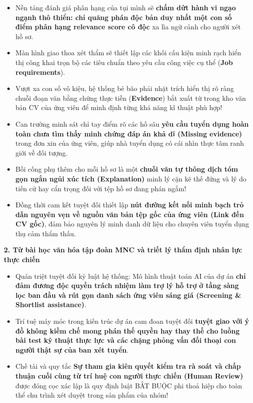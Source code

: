 \begin{itemize}
\tightlist
\item
  Nền tảng đánh giá phân hạng của tụi mình sẽ \textbf{chấm dứt hành vi
  ngạo ngạnh thô thiển: chỉ quăng phán độc bản duy nhất một con số điểm
  phân hạng relevance score cô độc} xa lìa ngữ cảnh cho người xét hồ sơ.
\item
  Màn hình giao thoa xét thẩm sẽ thiết lập các khối cấu kiện minh rạch
  hiển thị công khai trọn bộ các tiêu chuẩn theo yêu cầu công việc cụ
  thể (\textbf{Job requirements}).
\item
  Vượt xa con số vô kiệu, hệ thống bẻ bão phải nhặt trích hiển thị rõ
  ràng chuỗi đoạn văn bằng chứng thực tiễn (\textbf{Evidence}) bắt xuất
  từ trong kho văn bản CV của ứng viên để minh định từng khả năng kĩ
  thuật phù hợp!
\item
  Can trường minh sát chỉ tay điểm rõ các hố sâu \textbf{yêu cầu tuyển
  dụng hoàn toàn chưa tìm thấy minh chứng đáp án khả dĩ (Missing
  evidence)} trong đơn xin của ứng viên, giúp nhà tuyển dụng có cái nhìn
  thực tâm ranh giới về đối tượng.
\item
  Bồi cống phụ thêm cho mỗi hồ sơ là một \textbf{chuỗi văn tự thông dịch
  tóm gọn ngắn ngủi xúc tích (Explanation)} minh lý cặn kẽ thế đứng và
  lý do tiến cử hay cẩn trọng đối với tệp hồ sơ đang phán ngắm!
\item
  Đồng thời cam kết tuyệt đối thiết lập \textbf{nút đường kết nối minh
  bạch trỏ dẫn nguyên vẹn về nguồn văn bản tệp gốc của ứng viên (Link
  đến CV gốc)}, đảm bảo nguyên lý minh danh dữ liệu cho chuyên viên
  tuyển dụng thụ cảm thẩm thấu.
\end{itemize}

\vspace{0.5em}\noindent\textbf{2. Từ bài học văn hóa tập đoàn MNC và triết lý thẩm định
nhân lực thực
chiến}\par

\begin{itemize}
\tightlist
\item
  Quán triệt tuyệt đối kỷ luật hệ thống: Mô hình thuật toán AI của dự án
  \textbf{chỉ đảm đương độc quyền trách nhiệm làm trợ lý hỗ trợ ở tầng
  sàng lọc ban đầu và rút gọn danh sách ứng viên sáng giá (Screening \&
  Shortlist assistance)}.
\item
  Trí tuệ máy móc trong kiến trúc dự án cam đoan tuyệt đối \textbf{tuyệt
  giao với ý đồ không kiềm chế mong phán thế quyền hay thay thế cho
  luồng bài test kỹ thuật thực lực và các chặng phỏng vấn đối thoại con
  người thật sự của ban xét tuyển}.
\item
  Chế tài và quy tắc \textbf{Sự tham gia kiên quyết kiểm tra rà soát và
  chấp thuận cuối cùng từ trí huệ con người thực chiến (Human Review)}
  được đóng cọc xác lập là quy định luật BẮT BUỘC phi thoả hiệp cho toàn
  thể chu trình xét duyệt trong sản phẩm của nhóm!
\end{itemize}

